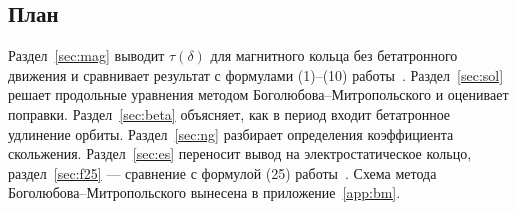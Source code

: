 \subsection{План}

Раздел~\ref{sec:mag} выводит $\tau(\delta)$ для магнитного кольца без бетатронного движения и сравнивает результат с формулами (1)--(10) работы~\cite{Senichev2013}. Раздел~\ref{sec:sol} решает продольные уравнения методом Боголюбова--Митропольского и оценивает поправки. Раздел~\ref{sec:beta} объясняет, как в период входит бетатронное удлинение орбиты. Раздел~\ref{sec:ng} разбирает определения коэффициента скольжения. Раздел~\ref{sec:es} переносит вывод на электростатическое кольцо, раздел~\ref{sec:f25} --- сравнение с формулой (25) работы~\cite{Senichev2013}. Схема метода Боголюбова--Митропольского вынесена в приложение~\ref{app:bm}.
